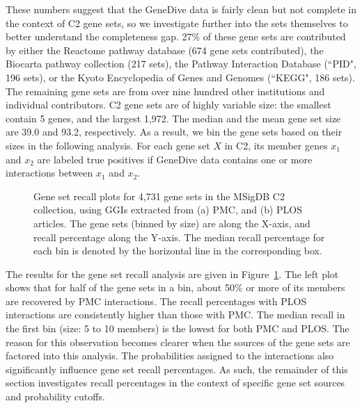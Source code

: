 \documentclass{ws-procs11x85}
\begin{document}
These numbers suggest that the GeneDive data is fairly clean but not complete in the context of C2 gene sets, so we investigate further into the sets themselves to better understand the completeness gap. 27\% of these gene sets are contributed by either the Reactome pathway database (674 gene sets contributed), the Biocarta pathway collection (217 sets), the Pathway Interaction Database (``PID", 196 sets), or the Kyoto Encyclopedia of Genes and Genomes (``KEGG", 186 sets). The remaining gene sets are from  over nine hundred other institutions and individual contributors. C2 gene sets are of highly variable size: the smallest contain 5 genes, and the largest 1,972.  The median and the mean gene set size are 39.0 and 93.2, respectively.  As a result, we bin the gene sets based on their sizes in the following analysis. For each gene set $X$ in C2, its member genes $x_1$ and $x_2$ are labeled true positives if GeneDive data contains one or more interactions between $x_1$ and $x_2$. 

\begin{figure}
\centering

\quad
{}
\caption{Gene set recall plots for 4,731 gene sets in the MSigDB C2 collection, using GGIs extracted from (a) PMC, and (b) PLOS articles. The gene sets (binned by size) are along the X-axis, and recall percentage along the Y-axis. The median recall percentage for each bin is denoted by the horizontal line in the corresponding box.}
\label{fig:0cutoff}
\end{figure}

The results for the gene set recall analysis are given in Figure~\ref{fig:0cutoff}. The left plot shows that for half of the gene sets in a bin, about 50\% or more of its members are recovered by PMC interactions.  The recall percentages with PLOS interactions are consistently higher than those with PMC.  The median recall in the first bin (size: 5 to 10 members) is the lowest for both PMC and PLOS.  %
The reason for this observation becomes clearer when the sources of the gene sets are factored into this analysis.  The probabilities assigned to the interactions also significantly influence gene set recall percentages. As such, the remainder of this section investigates recall percentages in the context of specific gene set sources and probability cutoffs.  
\end{document}
